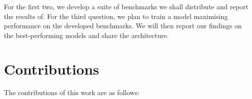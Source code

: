 For the first two, we develop a suite of benchmarks we shall distribute and report the results of. 
For the third question, we plan to train a model maximising performance on the developed benchmarks. We will then report our findings on the best-performing models and share the architecture.

\section{Contributions}

The contributions of this work are as follows:


